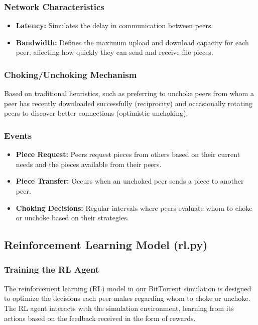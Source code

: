 \documentclass{article}
\begin{document}
\subsubsection{Network Characteristics}
\begin{itemize}
    \item \textbf{Latency:} Simulates the delay in communication between peers.
    \item \textbf{Bandwidth:} Defines the maximum upload and download capacity for each peer, affecting how quickly they can send and receive file pieces.
\end{itemize}

\subsubsection{Choking/Unchoking Mechanism}
Based on traditional heuristics, such as preferring to unchoke peers from whom a peer has recently downloaded successfully (reciprocity) and occasionally rotating peers to discover better connections (optimistic unchoking).

\subsubsection{Events}
\begin{itemize}
    \item \textbf{Piece Request:} Peers request pieces from others based on their current needs and the pieces available from their peers.
    \item \textbf{Piece Transfer:} Occurs when an unchoked peer sends a piece to another peer.
    \item \textbf{Choking Decisions:} Regular intervals where peers evaluate whom to choke or unchoke based on their strategies.
\end{itemize}

\subsection{Reinforcement Learning Model (rl.py)}
\subsubsection{Training the RL Agent}
The reinforcement learning (RL) model in our BitTorrent simulation is designed to optimize the decisions each peer makes regarding whom to choke or unchoke. The RL agent interacts with the simulation environment, learning from its actions based on the feedback received in the form of rewards.
\end{document}
